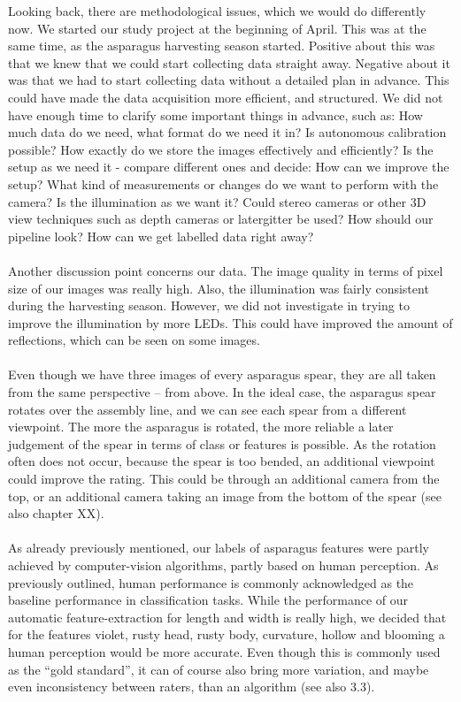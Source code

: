 Looking back, there are methodological issues, which we would do differently now. We started our study project at the beginning of April. This was at the same time, as the asparagus harvesting season started. Positive about this was that we knew that we could start collecting data straight away. Negative about it was that we had to start collecting data without a detailed plan in advance. This could have made the data acquisition more efficient, and structured. We did not have enough time to clarify some important things in advance, such as: How much data do we need, what format do we need it in? Is autonomous calibration possible? How exactly do we store the images effectively and efficiently? Is the setup as we need it - compare different ones and decide:  How can we improve the setup?  What kind of measurements or changes do we want to perform with the camera?  Is the illumination as we want it? Could stereo cameras or other 3D view techniques such as depth cameras or latergitter be used? How should our pipeline look? How can we get labelled data right away?  \\
\\
Another discussion point concerns our data. The image quality in terms of pixel size of our images was really high. Also, the illumination was fairly consistent during the harvesting season. However, we did not investigate in trying to improve the illumination by more LEDs. This could have improved the amount of reflections, which can be seen on some images. \\
\\
Even though we have three images of every asparagus spear, they are all taken from the same perspective – from above. In the ideal case, the asparagus spear rotates over the assembly line, and we can see each spear from a different viewpoint. The more the asparagus is rotated, the more reliable a later judgement of the spear in terms of class or features is possible. As the rotation often does not occur, because the spear is too bended, an additional viewpoint could improve the rating. This could be through an additional camera from the top, or an additional camera taking an image from the bottom of the spear (see also chapter XX). \\
\\
As already previously mentioned, our labels of asparagus features were partly achieved by computer-vision algorithms, partly based on human perception. As previously outlined, human performance is commonly acknowledged as the baseline performance in classification tasks. While the performance of our automatic feature-extraction for length and width is really high, we decided that for the features violet, rusty head, rusty body, curvature, hollow and blooming a human perception would be more accurate. Even though this is commonly used as the “gold standard”, it can of course also bring more variation, and maybe even inconsistency between raters, than an algorithm (see also 3.3). \\
